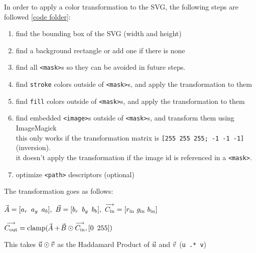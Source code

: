 \documentclass[12pt]{article}
\newcommand \hpx [1]{\hspace{#1px}}
\newcommand \nhpx [1]{\hspace{-#1px}}
\newcommand \Avec {\!\nhpx{-0.5}\vec{\hpx{0.5}A}}
\newcommand \Bvec {\nhpx{1.5}\vec{\hpx{0.3}B}}
\newcommand \uvec {\nhpx 1 \vec{\hpx 1 u}}
\newcommand \vvec {\nhpx 1 \vec{\hpx 1 v}}
\begin{document}
In order to apply a color transformation to the SVG, the following steps are followed
\ref{code folder}:
\begin{enumerate}
	\item \vspace{-0.5em} find the bounding box of the SVG (width and height)
	\item \vspace{-0.5em} find a background rectangle or add one if there is none
	\item \vspace{-0.5em} find all \texttt{<mask>}s so they can be avoided in
		future steps.
	\item \vspace{-0.5em} find {\tt stroke} colors outside of {\tt <mask>}s,
		and apply the transformation to them
	\item \vspace{-0.5em} find {\tt fill} colors outside of {\tt <mask>}s,
		and apply the transformation to them
	\item \vspace{-0.5em} find embedded {\tt <image>}s outside of {\tt <mask>}s,
		and transform them using ImageMagick\\
		this only works if the transformation matrix is {\tt [255 255 255; -1 -1 -1]}
		(inversion).\\
		it doesn't apply the transformation if the image id is referenced in a
		{\tt <mask>}.
	\item \vspace{-0.5em} optimize {\tt <path>} descriptors (optional)
\end{enumerate}

\pagebreak\restoregeometry

\noindent The transformation goes as follows:

$\Avec = [a_r ~\, a_g ~\, a_b],~\vec B = [b_r ~\, b_g ~\, b_b],~\overset{
\text{\raisebox{-0.5px}{$\longrightarrow$}}}{C_{\text{in}}} = [r_{\text{in}}
~ g_{\text{in}} ~ b_{\text{in}}]$

$\overset{\text{\raisebox{-0.5px}{$\longrightarrow$}}}{C_{\text{out}}} =
\text{clamp}(\Avec + \Bvec \odot
\overset{\text{\raisebox{-0.5px}{$\longrightarrow$}}}{C_{\text{in}}}, [0 ~\, 255])$

\noindent This takes $\uvec \odot \vvec$ as the Haddamard Product of $\uvec$ and
$\vvec$ (\texttt{\textcolor{variable}u \textcolor{operator}{.*} \textcolor{variable}v})
\vspace{5px}
\end{document}
